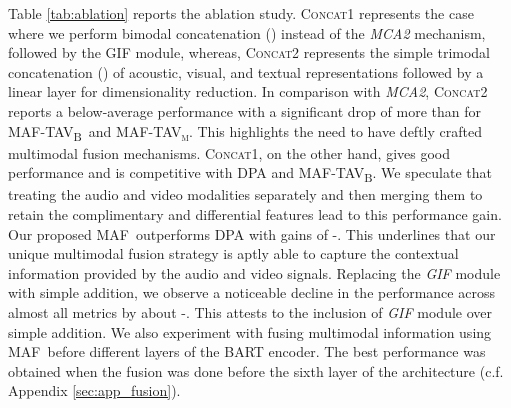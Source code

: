 \documentclass[11pt]{article}
\newcommand{\model}{\textsc{MAF}}
\newcommand{\modelTAV}{\textsc{MAF-TAV\textsubscript{B}}}
\newcommand{\modelTAVm}{\textsc{MAF-TAV\textsubscript{m}}}
\begin{document}
Table \ref{tab:ablation} reports the ablation study. \textsc{Concat1} represents the case where we perform bimodal concatenation () instead of the \textit{MCA2} mechanism, followed by the GIF module, whereas, \textsc{Concat2} represents the simple trimodal concatenation () of acoustic, visual, and textual representations followed by a linear layer for dimensionality reduction. In comparison with \textit{MCA2}, \textsc{Concat2} reports a below-average performance with a significant drop of more than  for \modelTAV\ and \modelTAVm. This highlights the need to have deftly crafted multimodal fusion mechanisms. \textsc{Concat1}, on the other hand, gives good performance and is competitive with \textsc{DPA} and \modelTAV. We speculate that treating the audio and video modalities separately and then merging them to retain the complimentary and differential features lead to this performance gain. Our proposed \model\ outperforms \textsc{DPA} with gains of -. This underlines that our unique multimodal fusion strategy is aptly able to capture the contextual information provided by the audio and video signals. Replacing the \textit{GIF} module with simple addition, we observe a noticeable decline in the performance across almost all metrics by about -. This attests to the inclusion of \textit{GIF} module over simple addition.
We also experiment with fusing multimodal information using \model\ before different layers of the BART encoder. The best performance was obtained when the fusion was done before the sixth layer of the architecture (c.f. Appendix \ref{sec:app_fusion}).
\end{document}
